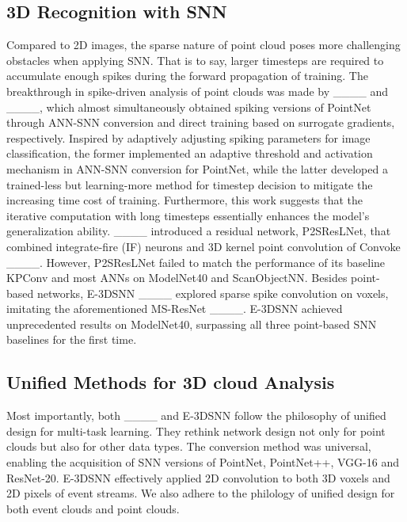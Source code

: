 \subsection{3D Recognition with SNN}
Compared to 2D images, the sparse nature of point cloud poses more challenging obstacles when applying SNN. That is to say, larger timesteps are required to accumulate enough spikes during the forward propagation of training. The breakthrough in spike-driven analysis of point clouds was made by ____ and ____, which almost simultaneously obtained spiking versions of PointNet through ANN-SNN conversion and direct training based on surrogate gradients, respectively. Inspired by adaptively adjusting spiking parameters for image classification, the former implemented an adaptive threshold and activation mechanism in ANN-SNN conversion for PointNet, while the latter developed a trained-less but learning-more method for timestep decision to mitigate the increasing time cost of training. Furthermore, 
this work suggests that the iterative computation with long timesteps essentially enhances the model's generalization ability. ____ introduced a residual network, P2SResLNet, that combined integrate-fire (IF) neurons and 3D kernel point convolution of Convoke ____. However, P2SResLNet failed to match the performance of its baseline KPConv and most ANNs on ModelNet40 and ScanObjectNN. Besides point-based networks, E-3DSNN ____ explored sparse spike convolution on voxels, imitating the aforementioned MS-ResNet ____. E-3DSNN achieved unprecedented results on ModelNet40, surpassing all three point-based SNN baselines for the first time.
\subsection{Unified Methods for 3D cloud Analysis}
Most importantly, both ____ and E-3DSNN follow the philosophy of unified design for multi-task learning. They rethink network design not only for point clouds but also for other data types. The conversion method was universal, enabling the acquisition of SNN versions of PointNet, PointNet++, VGG-16 and ResNet-20. E-3DSNN effectively applied 2D convolution to both 3D voxels and 2D pixels of event streams. We also adhere to the philology of unified design for both event clouds and point clouds. 

